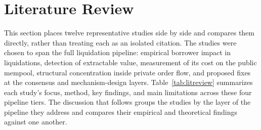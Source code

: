 \documentclass[conference]{IEEEtran}
\begin{document}
\section{Literature Review}
\label{sec:litreview}

This section places twelve representative studies side by side and
compares them directly, rather than treating each as an isolated
citation. The studies were chosen to span the full liquidation
pipeline: empirical borrower impact in liquidations, detection of extractable value,
measurement of its cost on the public mempool, structural concentration inside
private order flow, and proposed fixes at the consensus and mechanism-design layers.
Table~\ref{tab:litreview} summarizes each study's focus, method, key findings, and
main limitations across these four pipeline tiers. The discussion that follows groups the
studies by the layer of the pipeline they address and compares their empirical and
theoretical findings against one another.
\end{document}
